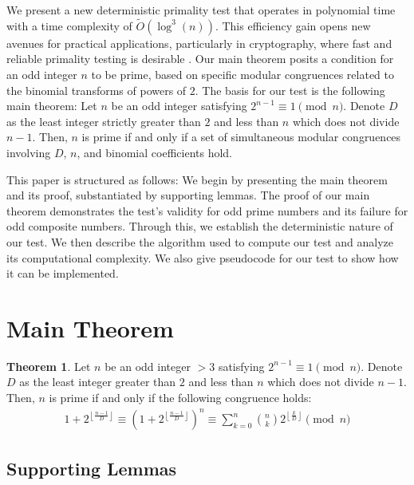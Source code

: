 \documentclass{article}
\theoremstyle{plain}
\theoremstyle{definition}
\newtheorem{theorem}{Theorem}
\begin{document}
We present a new deterministic primality test that operates in polynomial time with a time complexity of $\tilde{O}(\log^3(n))$. This efficiency gain opens new avenues for practical applications, particularly in cryptography, where fast and reliable primality testing is desirable \cite{pomerance1984}. Our main theorem posits a condition for an odd integer \( n \) to be prime, based on specific modular congruences related to the binomial transforms of powers of $2$. The basis for our test is the following main theorem: Let \( n \) be an odd integer satisfying \( 2^{n-1} \equiv 1 \pmod{n} \). Denote \( D \) as the least integer strictly greater than \( 2 \) and less than \( n \) which does not divide \( n-1 \). Then, \( n \) is prime if and only if a set of simultaneous modular congruences involving \( D \), \( n \), and binomial coefficients hold.

This paper is structured as follows: We begin by presenting the main theorem and its proof, substantiated by supporting lemmas. The proof of our main theorem demonstrates the test's validity for odd prime numbers and its failure for odd composite numbers. Through this, we establish the deterministic nature of our test. We then describe the algorithm used to compute our test and analyze its computational complexity. We also give pseudocode for our test to show how it can be implemented.

\section{Main Theorem}

\begin{theorem}
\label{theorem:1}
Let $n$ be an odd integer $> 3$ satisfying $2^{n-1} \equiv 1 \pmod{n}$. Denote $D$ as the least integer greater than $2$ and less than $n$ which does not divide $n-1$. Then, $n$ is prime if and only if the following congruence holds:
\begin{align}
    1 + 2^{\left\lfloor \frac{n-1}{D} \right\rfloor} \equiv \left(1 + 2^{\left\lfloor \frac{n-1}{D} \right\rfloor}\right)^{n} \equiv \sum_{k=0}^{n} \binom{n}{k} 2^{\left\lfloor \frac{k}{D} \right\rfloor} \pmod{n}
\end{align}
\end{theorem}

\subsection{Supporting Lemmas}
\end{document}

